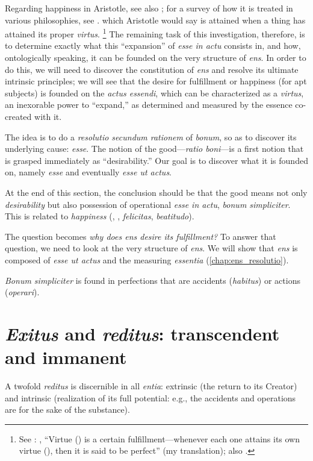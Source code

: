 {{Regarding happiness in Aristotle, see also \cite[203--204]{izquierdo:vita}; for a survey of how it is treated in various philosophies, see \cite[254--275]{millan-puelles:libre}.}
%
which Aristotle would say is attained when a thing has attained its proper \emph{virtus}.%
%
\footnote{See \cite[,~2, 264a13-15]{aristotle:physics}: , ``Virtue () is a certain fulfillment---whenever each one attains its own virtue (), then it is said to be perfect'' (my translation); also \cite[34]{orourke:virtus}.}
%
The remaining task of this investigation, therefore, is to determine exactly what this ``expansion'' of \emph{esse in actu} consists in, and how, ontologically speaking, it can be founded on the very structure of \emph{ens}. In order to do this, we will need to discover the constitution of \emph{ens} and resolve its ultimate intrinsic principles; we will see that the desire for fulfillment or happiness (for apt subjects) is founded on the \emph{actus essendi}, which can be characterized as a \emph{virtus}, an inexorable power to ``expand,'' as determined and measured by the essence co-created with it.

\begin{DONE}

The idea is to do a \emph{resolutio secundum rationem} of \emph{bonum}, so as to discover its underlying cause: \emph{esse}. The notion of the good---\emph{ratio boni}---is a first notion that is grasped immediately as \enquote{desirability.}
Our goal is to discover what it is founded on, namely \emph{esse} and eventually \emph{esse ut actus}.

At the end of this section, the conclusion should be that the good means not only \emph{desirability} but also possession of operational \emph{esse in actu}, \emph{bonum simpliciter}. This is related to \emph{happiness} (, , \emph{felicitas}, \emph{beatitudo}).


The question becomes \emph{why does \emph{ens} desire its fulfillment?} To answer that question, we need to look at the very structure of \emph{ens}. We will show that \emph{ens} is composed of \emph{esse ut actus} and the measuring \emph{essentia} (\autoref{chap:ens_resolutio}).

\emph{Bonum simpliciter} is found in perfections that are accidents (\emph{habitus}) or actions (\emph{operari}).

\section{\emph{Exitus} and \emph{reditus}: transcendent and immanent}
A twofold \emph{reditus} is discernible in all \emph{entia}: extrinsic (the return to its Creator) and intrinsic (realization of its full potential: e.g., the accidents and operations are for the sake of the substance).


\end{DONE}}
